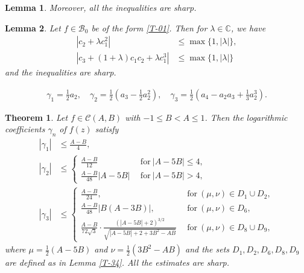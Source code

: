 \documentclass[10pt,a4paper]{amsart}
\newtheorem{thm}{Theorem}
\newtheorem{lem}{Lemma}
\begin{document}
\begin{lem}
Moreover, all the inequalities are sharp.
\end{lem}

 \begin{lem}\label{T-200}\cite{2016-Iason}
 Let $f\in\mathcal{B}_0$ be of the form \eqref{T-01}. Then for $\lambda \in \mathbb{C} $, we have
\begin{align*}
|c_2+\lambda c_1^2| &\le  \max\{1, |\lambda|\},\\
|c_3+(1+\lambda) c_1c_2+\lambda c_1^3| &\le \max\{1, |\lambda|\}
\end{align*}
and the inequalities are sharp.
 \end{lem}

\begin{align}\label{T-15}
\gamma_1=\frac{1}{2}a_2,\quad \gamma_2=\frac{1}{2}\left(a_3-\frac{1}{2}a_2^2\right),\quad \gamma_3=\frac{1}{2}\left(a_4-a_2a_3+\frac{1}{3}a_2^3\right).
\end{align}

\begin{thm}\label{T-thm-20}
Let \( f \in \mathcal{C}(A,B) \) with \( -1 \leq B < A \leq 1 \). Then the logarithmic coefficients \( \gamma_n \) of \( f(z) \) satisfy
\begin{align*}
|\gamma_1| &\leq \frac{A - B}{4},\\
|\gamma_2| &\leq 
\begin{cases}
\displaystyle \frac{A-B}{12} & ~~\text{for}~ |A-5B|\le 4,\\[2mm]
\displaystyle \frac{A-B}{48}|A-5B| & ~~\text{for}~ |A-5B|>4,
 \end{cases}\\[3mm]
|\gamma_3| &\leq 
\begin{cases}
\displaystyle \frac{A - B}{24}, &~~\text{for}~(\mu,\nu)\in D_1\cup D_2, \\[2mm]
\displaystyle \frac{A - B}{48}|B(A - 3B)|, & ~~\text{for}~(\mu,\nu)\in D_6, \\[2mm]
\displaystyle \frac{A-B}{72\sqrt{3}} \cdot \frac{\left( |A - 5B| + 2 \right)^{3/2}}{\sqrt{|A - 5B| + 2 + 3B^{2} - AB}}  & ~~\text{for}~(\mu,\nu)\in D_8\cup D_9,
\end{cases}
\end{align*}
where \(\mu = \frac{1}{2}(A - 5B)\) and \(\nu = \frac{1}{2}(3B^2 - AB)\) and the sets $D_1,D_2, D_6, D_8,D_9$ are defined as in Lemma \ref{T-34}.
All the estimates are sharp.
\end{thm}
\end{document}
